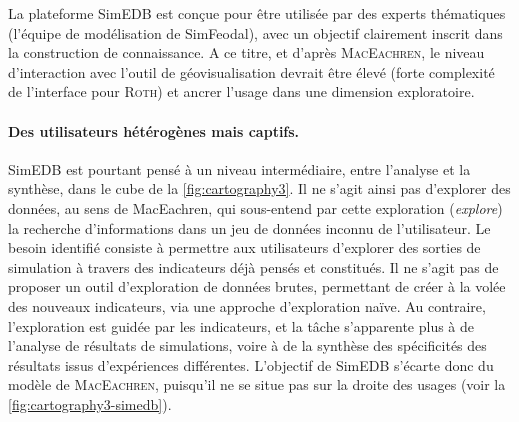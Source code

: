 La plateforme SimEDB est conçue pour être utilisée par des experts thématiques (l'équipe de modélisation de SimFeodal), avec un objectif clairement inscrit dans la construction de connaissance.
A ce titre, et d'après \textsc{MacEachren}, le niveau d'interaction avec l'outil de géovisualisation devrait être élevé (forte complexité de l'interface pour \textsc{Roth}) et ancrer l'usage dans une dimension exploratoire.



\paragraph{Des utilisateurs hétérogènes mais captifs.}

SimEDB est pourtant pensé à un niveau intermédiaire, entre l'analyse et la synthèse, dans le cube de la \cref{fig:cartography3}.
Il ne s'agit ainsi pas d'explorer des données, au sens de MacEachren, qui sous-entend par cette exploration (\textit{explore}) la recherche d'informations dans un jeu de données inconnu de l'utilisateur.
Le besoin identifié consiste à permettre aux utilisateurs d'explorer des sorties de simulation à travers des indicateurs déjà pensés et constitués.
Il ne s'agit pas de proposer un outil d'exploration de données brutes, permettant de créer à la volée des nouveaux indicateurs, via une approche d'exploration \og naïve\fg{}.
Au contraire, l'exploration est guidée par les indicateurs, et la tâche s'apparente plus à de l'analyse de résultats de simulations, voire à de la synthèse des spécificités des résultats issus d'expériences différentes.
L'objectif de SimEDB s'écarte donc du \og modèle\fg{} de \textsc{MacEachren}, puisqu'il ne se situe pas sur la \og droite\fg{} des usages (voir la \cref{fig:cartography3-simedb}).

